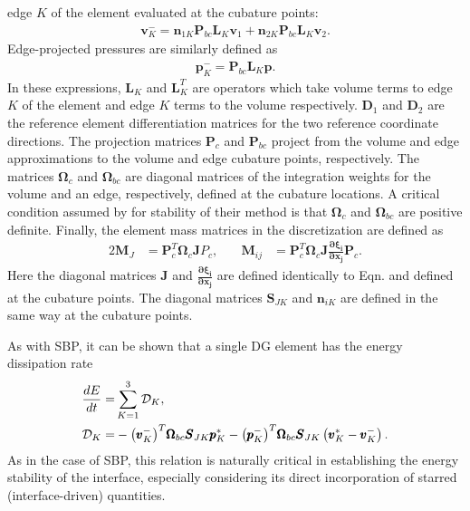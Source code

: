edge $K$ of the element evaluated at the cubature points:
\begin{align}
  \pmb{v}^{-}_{K} = \pmb{n}_{1K} \pmb{P}_{bc} \pmb{L}_{K} \pmb{v}_{1}
  + \pmb{n}_{2K} \pmb{P}_{bc} \pmb{L}_{K} \pmb{v}_{2}.
\end{align}
Edge-projected pressures are similarly defined as
\begin{align}
  \pmb{p}_{K}^{-} = \pmb{P}_{bc}\pmb{L}_{K} \pmb{p}.
\end{align}
In these expressions, $\pmb{L}_{K}$ and $\pmb{L}_{K}^{T}$ are operators
which take volume terms to edge $K$ of the element and edge $K$ terms to
the volume respectively. $\pmb{D}_{1}$ and $\pmb{D}_{2}$ are the reference
element differentiation matrices for the two reference coordinate directions.
The projection matrices $\pmb{P}_{c}$ and $\pmb{P}_{bc}$ project from the volume and edge
approximations to the volume and edge cubature points, respectively. The matrices
$\pmb{\Omega}_{c}$ and $\pmb{\Omega}_{bc}$ are diagonal matrices of the integration weights for
the volume and an edge, respectively, defined at the cubature locations. A critical
condition assumed by \cite{kozdon2016stable} for stability of their method is that
$\pmb{\Omega}_{c}$ and $\pmb{\Omega}_{bc}$ are positive definite. Finally, the
element mass matrices in the discretization are defined as
\begin{alignat}{2}
  \pmb{M}_{J}  &= \pmb{P}_{c}^{T} \pmb{\Omega}_{c} \pmb{J} P_{c},\quad&
  \pmb{M}_{ij} &= \pmb{P}_{c}^{T} \pmb{\Omega}_{c} \pmb{J}
		  \frac{\pmb{\partial \xi_{i}}}{\pmb{\partial x_{j}}} \pmb{P}_{c}.
\end{alignat}
Here the diagonal matrices $\pmb{J}$ and $\pmb{\frac{\partial \xi_{i}}{\partial x_{j}}}$
are defined identically to Eqn.  and defined at the cubature points.
The diagonal matrices $\pmb{S}_{JK}$ and $\pmb{n}_{iK}$ are defined in the same way at the cubature
points.

As with SBP, it can be shown that a single DG element has
the energy dissipation rate
\begin{align}
  \frac{dE}{dt} = & \sum_{K=1}^{3} \mathcal{D}_{K},\\
  \mathcal{D}_{K} = &
  - {\left(\pmb{v}_{K}^{-}\right)}^{T}\pmb{\Omega}_{bc}\pmb{S}_{JK}\pmb{p}_{K}^{*}
  - {\left(\pmb{p}_{K}^{-}\right)}^{T}\pmb{\Omega}_{bc}\pmb{S}_{JK}
  \left(\pmb{v}^{*}_{K} - \pmb{v}^{-}_{K}\right). \label{eq:dg_diss}
\end{align}
As in the case of SBP, this relation is naturally critical in establishing the
energy stability of the interface, especially considering its direct incorporation
of starred (interface-driven) quantities.

